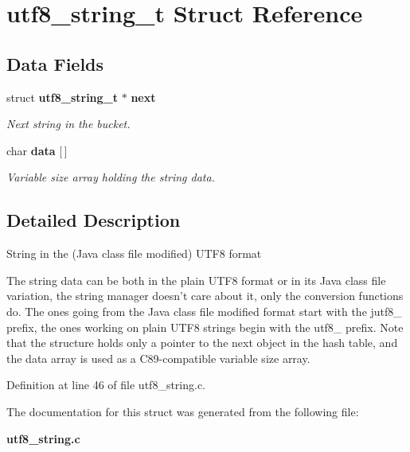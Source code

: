 \section{utf8\_\-string\_\-t Struct Reference}
\label{structutf8__string__t}
\subsection*{Data Fields}
\begin{DoxyCompactItemize}
\item 
struct {\bf utf8\_\-string\_\-t} $\ast$ {\bf next}\label{structutf8__string__t_a77a7a2e16c8cefe509f7d9ca9d315e4c}

\begin{DoxyCompactList}\small\item\em Next string in the bucket. \item\end{DoxyCompactList}\item 
char {\bf data} [$\,$]\label{structutf8__string__t_ad77a06e419d01185d65ba43d53a39605}

\begin{DoxyCompactList}\small\item\em Variable size array holding the string data. \item\end{DoxyCompactList}\end{DoxyCompactItemize}


\subsection{Detailed Description}
String in the (Java class file modified) UTF8 format

The string data can be both in the plain UTF8 format or in its Java class file variation, the string manager doesn't care about it, only the conversion functions do. The ones going from the Java class file modified format start with the jutf8\_\- prefix, the ones working on plain UTF8 strings begin with the utf8\_\- prefix. Note that the structure holds only a pointer to the next object in the hash table, and the data array is used as a C89-\/compatible variable size array. 

Definition at line 46 of file utf8\_\-string.c.



The documentation for this struct was generated from the following file:\begin{DoxyCompactItemize}
\item 
{\bf utf8\_\-string.c}\end{DoxyCompactItemize}
